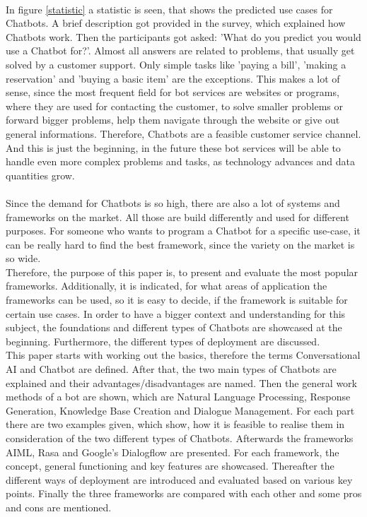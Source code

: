 \documentclass[10pt,final,journal,a4paper,oneside,twocolumn]{IEEEtran}
\begin{document}
\\
In figure \ref{statistic} a statistic is seen, that shows the predicted use cases for Chatbots. A brief description got provided in the survey, which explained how Chatbots work. Then the participants got asked: 'What do you predict you would use a Chatbot for?'. Almost all answers are related to problems, that usually get solved by a customer support. Only simple tasks like 'paying a bill', 'making a reservation' and 'buying a basic item' are the exceptions. This makes a lot of sense, since the most frequent field for bot services are websites or programs, where they are used for contacting the customer, to solve smaller problems or forward bigger problems, help them navigate through the website or give out general informations. Therefore, Chatbots are a feasible customer service channel. And this is just the beginning, in the future these bot services will be able to handle even more complex problems and tasks, as technology advances and data quantities grow.\\
\\
Since the demand for Chatbots is so high, there are also a lot of systems and frameworks on the market. All those are build differently and used for different purposes. For someone who wants to program a Chatbot for a specific use-case, it can be really hard to find the best framework, since the variety on the market is so wide.\\
Therefore, the purpose of this paper is, to present and evaluate the most popular frameworks. Additionally, it is indicated, for what areas of application the frameworks can be used, so it is easy to decide, if the framework is suitable for certain use cases. In order to have a bigger context and understanding for this subject, the foundations and different types of Chatbots are showcased at the beginning. Furthermore, the different types of deployment are discussed. \\
This paper starts with working out the basics, therefore the terms Conversational AI and Chatbot are defined. After that, the two main types of Chatbots are explained and their advantages/disadvantages are named. Then the general work methods of a bot are shown, which are Natural Language Processing, Response Generation, Knowledge Base Creation and Dialogue Management. For each part there are two examples given, which show, how it is feasible to realise them in consideration of the two different types of Chatbots. Afterwards the frameworks AIML, Rasa and Google's Dialogflow are presented. For each framework, the concept, general functioning and key features are showcased. Thereafter the different ways of deployment are introduced and evaluated based on various key points. Finally the three frameworks are compared with each other and some pros and cons are mentioned.
\end{document}
